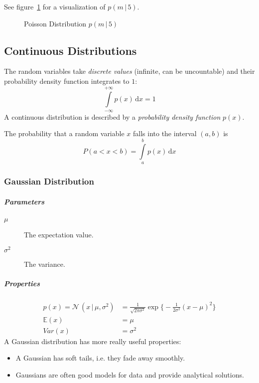 \documentclass[a4paper, 11pt, accentcolor = tud3b]{tudreport}
\newcommand{\E}{\ensuremath{\mathbb{E}}}
\newcommand{\given}{\ensuremath{\,\vert\,}}
\newcommand{\Var}{\ensuremath{\textit{Var}}}
\newcommand{\dif}[1]{\ensuremath{\,\mathrm{d}#1}}
\begin{document}
					See figure~\ref{fig:poissonDistribution} for a visualization of \( p(m \given 5) \).

					\begin{figure}
						\centering
						\caption{Poisson Distribution \( p(m \given 5) \)}
						\label{fig:poissonDistribution}
					\end{figure}

			\subsection{Continuous Distributions}
				The random variables take \emph{discrete values} (infinite, can be uncountable) and their probability density function integrates to \(1\):
				\begin{equation}
					\int\limits_{-\infty}^{+\infty} p(x) \dif{x} = 1
				\end{equation}
				A continuous distribution is described by a \emph{probability density function} \(p(x)\).

				The probability that a random variable \( x \) falls into the interval \( (a, b) \) is
				\begin{equation}
					P(a < x < b) = \int\limits_a^b p(x) \dif{x}
				\end{equation}

				\subsubsection{Gaussian Distribution}
					\subparagraph{Parameters}
					\begin{description}
						\item[\(\mu\)] The expectation value.
						\item[\(\sigma^2\)] The variance.
					\end{description}

					\subparagraph{Properties}
					\begin{align}
						p(x) = \mathcal{N}\,(x \given \mu, \sigma^2) &= \frac{1}{\sqrt{2\pi\sigma^2}} \exp\Bigg\{ -\frac{1}{2\sigma^2} (x - \mu)^2 \Bigg\} \\
						\E(x) &= \mu \\
						\Var(x) &= \sigma^2
					\end{align}
					A Gaussian distribution has more really useful properties:
					\begin{itemize}
						\item A Gaussian has soft tails, i.e. they fade away smoothly.
						\item Gaussians are often good models for data and provide analytical solutions.
					\end{itemize}
\end{document}
